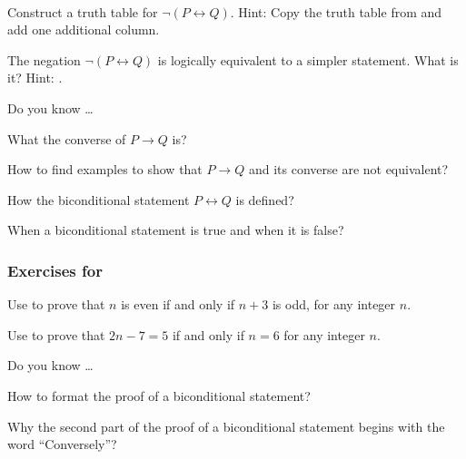 \begin{exer}[\exerU] %
\label{exer_neg_biconditional}   
~
    \begin{exerpart}
        \item Construct a truth table for $\neg(P \leftrightarrow Q)$.  Hint: Copy the truth table from  and add one additional column.      
        \item The negation $\neg(P \leftrightarrow Q)$ is logically equivalent to a simpler statement.  What is it?  Hint: .
    \end{exerpart}
\end{exer}

\begin{exer}[\exerR] %
\label{exer_dyk_converse_iff}
    Do you know \ldots
        \begin{exerpart}
            \item What the converse of $P \to Q$ is?
            \item How to find examples to show that $P \to Q$ and its converse are not equivalent?
            \item How the biconditional statement $P \leftrightarrow Q$ is defined?
            \item When a biconditional statement is true and when it is false?
        \end{exerpart}
\end{exer}


\subsubsection*{Exercises for  \subpffiff}

\begin{exer}[\exerP] %
\label{exer_proof_iff_even}
    Use  to prove that $n$ is even if and only if $n+3$ is odd, for any integer $n$.
\end{exer}
 
\begin{exer}[\exerP] %
\label{exer_proof_iff_solution}
    Use  to prove that $2n-7=5$ if and only if $n =6$ for any integer $n$.
\end{exer}

\begin{exer}[\exerR] %
\label{exer_dyk_pff_iff}
    Do you know \ldots
        \begin{exerpart}
            \item How to format the proof of a biconditional statement?
            \item Why the second part of the proof of a biconditional statement begins with the word ``Conversely''?
        \end{exerpart}
\end{exer}

